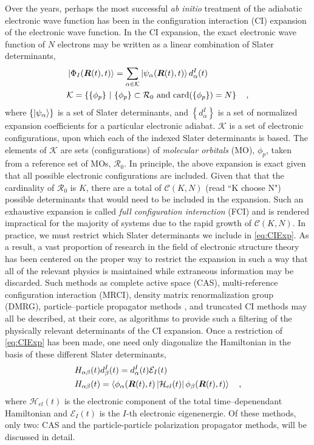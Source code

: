 Over the years, perhaps the most successful \emph{ab initio} treatment of the
adiabatic electronic wave function has been in the configuration interaction
(CI) expansion of the electronic wave function. In the CI expansion, the exact
electronic wave function of $N$ electrons may be written as a linear combination
of Slater determinants,
\begin{align}
&\left\vert \Phi_I (\boldsymbol{R}(t),t) \right\rangle = \sum_{\alpha \in \mathcal{K}}  
  \left\vert \psi_\alpha (\boldsymbol{R}(t),t) \right\rangle d^I_\alpha(t)
\label{eq:CIExp} \\
& \mathcal{K} = \left\lbrace \{ \phi_p \} \text{ }\vert\text{ } \{ \phi_p \} \subset
\mathcal{R}_0 \text{ and } \mathrm{card}(\{ \phi_p \}) = N \right\rbrace
\quad ,
\end{align}
where $\left\lbrace\left\vert \psi_\alpha \right\rangle\right\rbrace$ is a set of Slater
determinants, and $\left\lbrace d^I_\alpha \right\rbrace$ is a set of normalized
expansion coefficients for a particular electronic adiabat. $\mathcal{K}$ is a
set of electronic configurations, upon which each of the indexed Slater
determinants is based. The elements of $\mathcal{K}$ are sets (configurations)
of \emph{molecular orbitals} (MO), $\phi_p$, taken from a reference set of MOs,
$\mathcal{R}_0$.  In principle, the above expansion is exact given that all
possible electronic configurations are included.  Given that that the
cardinality of $\mathcal{R}_0$ is $K$, there are a total of $\mathcal{C}(K,N)$
(read ``K choose N") possible determinants that would need to be included in the
expansion. Such an exhaustive expansion is called \emph{full configuration
interaction} (FCI) and is rendered impractical for the majority of systems due
to the rapid growth of $\mathcal{C}(K,N)$.  In practice, we  must restrict which
Slater determinants we include in \cref{eq:CIExp}. As a result, a vast
proportion of research in the field of electronic structure theory has been
centered on the proper way to restrict the expansion in such a way that all of
the relevant physics is maintained while extraneous information may be
discarded. Such methods as complete active space (CAS), multi-reference
configuration interaction (MRCI), density matrix renormalization group (DMRG),
particle--particle propagator methods , and truncated CI methods may all be
described, at their core, as algorithms to provide such a filtering of the
physically relevant determinants of the CI expansion.  Once a restriction of
\cref{eq:CIExp} has been made, one need only diagonalize the Hamiltonian in the
basis of these different Slater determinants,
\begin{align}
&H_{\alpha\beta}(t) d_\beta^I(t) = d_\alpha^I(t) \mathcal{E}_I(t)\\
&H_{\alpha\beta}(t) =
\left\langle \phi_\alpha(\boldsymbol{R}(t),t) \left\vert \mathcal{H}_{el}(t) \right\vert \phi_\beta(\boldsymbol{R}(t),t) \right\rangle
\quad,
\end{align}
where $\mathcal{H}_{el}(t)$ is the electronic component of the total
time--depenendant Hamiltonian and $\mathcal{E}_I(t)$ is the $I$-th electronic
eigenenergie. 
Of these methods, only two: CAS and the particle-particle polarization
propagator methods, will be discussed in detail. 

